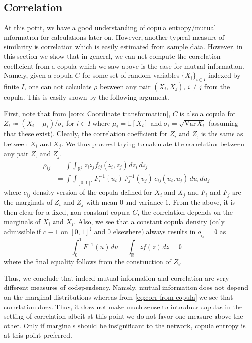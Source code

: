 \documentclass[../Thesis.tex]{subfiles}
\begin{document}
\subsection{Correlation}
At this point, we have a good understanding of copula entropy/mutual information for calculations later on. However, another typical measure of similarity is correlation which is easily estimated from sample data. However, in this section we show that in general, we can not compute the correlation coefficient from a copula which we saw above is the case for mutual information. Namely, given a copula $C$ for some set of random variables $\{X_i\}_{i\in I}$ indexed by finite $I$, one can not calculate $\rho$ between any pair $(X_i ,X_j)$, $i\neq j$ from the copula. This is easily shown by the following argument.

First, note that from \autoref{coro: Coordinate transformation}, $C$ is also a copula for $Z_i \coloneq \left( X_i - \mu_i\right) / \sigma_i$ for $i \in I$ where $\mu_i = \mathbb{E}[X_i]$ and $\sigma_i = \sqrt{\text{Var} \, X_i}$ (assuming that these exist). Clearly, the correlation coefficient for $Z_i$ and $Z_j$ is the same as between $X_i$ and $X_j$. We thus proceed trying to calculate the correlation between any pair $Z_i$ and $Z_j$.
\begin{equation}\label{eq:corr from copula}
    \begin{split}
        \rho_{ij} & = \int\int_{\mathbb{R}^2} z_i z_j f_{ij}(z_i,z_j) \, dz_i \, dz_j                       \\
                  & = \int\int_{[0,1]^2} F_i^{-1}(u_i) \, F_j^{-1}(u_j) \, c_{ij}(u_i, u_j) \, du_i \, du_j
    \end{split}
\end{equation}
where $c_{ij}$ density version of the copula defined for $X_i$ and $X_j$ and $F_i$ and $F_j$ are the marginals of $Z_i$ and $Z_j$ with mean $0$ and variance $1$. From the above, it is then clear for a fixed, non-constant copula $C$, the correlation depends on the marginals of $X_i$ and $X_j$. Also, we see that a constant copula density (only admissible if $c \equiv 1$ on $[0,1]^2$ and $0$ elsewhere) always results in $\rho_{ij} = 0$ as
$$\int_0^1 F^{-1}(u) \, du = \int_{\mathbb{R}} z f(z) \, dz = 0$$
where the final equality follows from the construction of $Z_i$.

Thus, we conclude that indeed mutual information and correlation are very different measures of codependency. Namely, mutual information does not depend on the marginal distributions whereas from \autoref{eq:corr from copula} we see that correlation does. Thus, it does not make much sense to introduce copulas in the setting of correlation albeit at this point we do not favor one measure above the other. Only if marginals should be insignificant to the network, copula entropy is at this point preferred.
\end{document}
